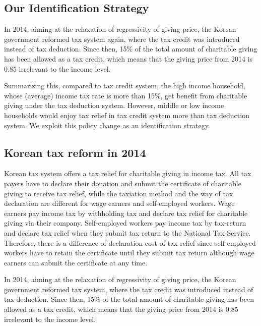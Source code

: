 \documentclass[
  11pt,
  a4paper,
]{article}
\begin{document}
\hypertarget{our-identification-strategy}{%
\subsection{Our Identification Strategy}\label{our-identification-strategy}}

In 2014, aiming at the relaxation of regressivity of giving price, the Korean government reformed tax system again, where the tax credit was introduced instead of tax deduction. Since then, 15\% of the total amount of charitable giving has been allowed as a tax credit, which means that the giving price from 2014 is 0.85 irrelevant to the income level.

Summarizing this, compared to tax credit system, the high income household, whose (average) income tax rate is more than 15\%, get benefit from charitable giving under the tax deduction system. However, middle or low income households would enjoy tax relief in tax credit system more than tax deduction system. We exploit this policy change as an identification strategy.

\hypertarget{korean-tax-reform-in-2014}{%
\subsection{Korean tax reform in 2014}\label{korean-tax-reform-in-2014}}

Korean tax system offers a tax relief for charitable giving in income tax. All tax payers have to declare their donation and submit the certificate of charitable giving to receive tax relief, while the taxiation method and the way of tax declaration are different for wage earners and self-employed workers. Wage earners pay income tax by withholding tax and declare tax relief for charitable giving via their company. Self-employed workers pay income tax by tax-return and declare tax relief when they submit tax return to the National Tax Service. Therefore, there is a difference of declaration cost of tax relief since self-employed workers have to retain the certificate until they submit tax return although wage earners can submit the certificate at any time.

In 2014, aiming at the relaxation of regressivity of giving price, the Korean government reformed tax system, where the tax credit was introduced instead of tax deduction. Since then, 15\% of the total amount of charitable giving has been allowed as a tax credit, which means that the giving price from 2014 is 0.85 irrelevant to the income level.
\end{document}
